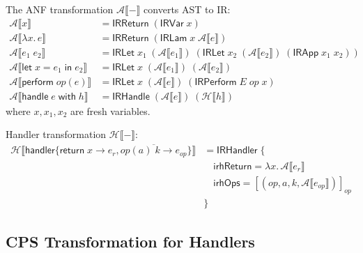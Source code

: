 \begin{definition}
\label{def:anf-rules}
The ANF transformation $\mathcal{A}\llbracket - \rrbracket$ converts AST to IR:
\begin{align}
\mathcal{A}\llbracket x \rrbracket &= \mathsf{IRReturn}\; (\mathsf{IRVar}\; x) \\
\mathcal{A}\llbracket \lambda x.\, e \rrbracket &= \mathsf{IRReturn}\; (\mathsf{IRLam}\; x\; \mathcal{A}\llbracket e \rrbracket) \\
\mathcal{A}\llbracket e_1\; e_2 \rrbracket &= \mathsf{IRLet}\; x_1\; (\mathcal{A}\llbracket e_1 \rrbracket)\; (\mathsf{IRLet}\; x_2\; (\mathcal{A}\llbracket e_2 \rrbracket)\; (\mathsf{IRApp}\; x_1\; x_2)) \\
\mathcal{A}\llbracket \mathsf{let}\; x = e_1\; \mathsf{in}\; e_2 \rrbracket &= \mathsf{IRLet}\; x\; (\mathcal{A}\llbracket e_1 \rrbracket)\; (\mathcal{A}\llbracket e_2 \rrbracket) \\
\mathcal{A}\llbracket \mathsf{perform}\; \mathit{op}(e) \rrbracket &= \mathsf{IRLet}\; x\; (\mathcal{A}\llbracket e \rrbracket)\; (\mathsf{IRPerform}\; E\; \mathit{op}\; x) \\
\mathcal{A}\llbracket \mathsf{handle}\; e\; \mathsf{with}\; h \rrbracket &= \mathsf{IRHandle}\; (\mathcal{A}\llbracket e \rrbracket)\; (\mathcal{H}\llbracket h \rrbracket)
\end{align}
where $x, x_1, x_2$ are fresh variables.
\end{definition}

\begin{definition}
\label{def:handler-anf}
Handler transformation $\mathcal{H}\llbracket - \rrbracket$:
\begin{align}
\mathcal{H}\llbracket \mathsf{handler}\{\mathsf{return}\; x \to e_r, \overline{\mathit{op}(a)\; k \to e_{op}}\} \rrbracket &= \mathsf{IRHandler}\; \{\\
    &\quad \mathsf{irhReturn} = \lambda x.\, \mathcal{A}\llbracket e_r \rrbracket \\
    &\quad \mathsf{irhOps} = [(\mathit{op}, a, k, \mathcal{A}\llbracket e_{op} \rrbracket)]_{\mathit{op}} \\
    &\}
\end{align}
\end{definition}

\subsection{CPS Transformation for Handlers}
\label{subsec:cps-transform}

